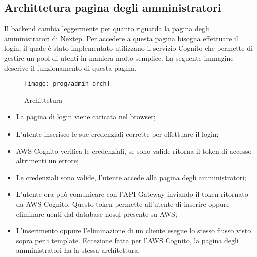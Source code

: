 \subsection{Archittetura pagina degli amministratori}
Il backend cambia leggermente per quanto riguarda la pagina degli amministratori di Nextep. Per accedere a questa pagina bisogna effettuare il login, il quale è stato implementato utilizzano il servizio Cognito che permette di gestire un pool di utenti in maniera molto semplice. La seguente immagine descrive il funzionamento di questa pagina. 
\begin{figure}[!h] 
	\centering 
	\texttt{[image: prog/admin-arch]} 
	\caption{Archittetura }
\end{figure} 
\begin{itemize}
	\item La pagina di login viene caricata nel browser;
	\item L'utente inserisce le sue credenziali corrette per effettuare il login;
	\item AWS Cognito verifica le credenziali, se sono valide ritorna il token di accesso altrimenti un errore;
	\item Le credenziali sono valide, l'utente accede alla pagina degli amministratori;
	\item L'utente ora può comunicare con l'API Gateway inviando il token ritornato da AWS Cognito. Questo token permette all'utente di inserire oppure eliminare uenti dal database nosql presente su AWS;
	\item L'inserimento oppure l'eliminazione di un cliente esegue lo stesso flusso visto sopra per i template. Eccezione fatta per l'AWS Cognito, la pagina degli amministratori ha la stessa architettura.
\end{itemize}
